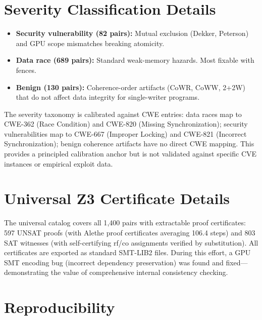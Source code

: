 \documentclass[11pt]{article}
\begin{document}
\section{Severity Classification Details}
\label{app:severity-details}

\begin{itemize}[nosep]
\item \textbf{Security vulnerability (82 pairs):} Mutual exclusion
  (Dekker, Peterson) and GPU scope mismatches breaking atomicity.
\item \textbf{Data race (689 pairs):} Standard weak-memory hazards.
  Most fixable with fences.
\item \textbf{Benign (130 pairs):} Coherence-order artifacts (CoWR, CoWW, 2+2W)
  that do not affect data integrity for single-writer programs.
\end{itemize}

\noindent
The severity taxonomy is calibrated against CWE entries:
data races map to CWE-362 (Race Condition) and CWE-820
(Missing Synchronization); security vulnerabilities map to
CWE-667 (Improper Locking) and CWE-821 (Incorrect Synchronization);
benign coherence artifacts have no direct CWE mapping.
This provides a principled calibration anchor but is not validated
against specific CVE instances or empirical exploit data.

\section{Universal Z3 Certificate Details}
\label{app:universal-cert-details}

The universal catalog covers all 1{,}400 pairs with extractable proof
certificates:
597 UNSAT proofs (with Alethe proof certificates averaging 106.4 steps) and
803 SAT witnesses (with self-certifying rf/co assignments verified by substitution).
All certificates are exported as standard SMT-LIB2 files.
During this effort, a GPU SMT encoding bug (incorrect dependency
preservation) was found and fixed---demonstrating the value of
comprehensive internal consistency checking.

\section{Reproducibility}
\label{app:reproducibility}
\end{document}
